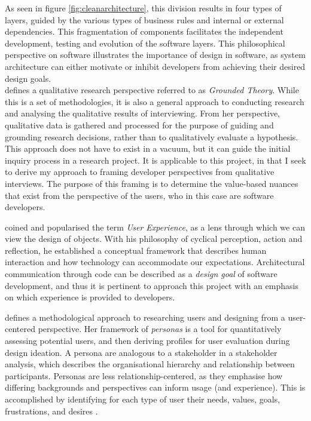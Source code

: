 \documentclass[../report.tex]{subfiles}
\begin{document}
As seen in figure \ref{fig:cleanarchitecture}, this division results in four types of layers, guided by the various types of business rules and internal or external dependencies. This fragmentation of components facilitates the independent development, testing and evolution of the software layers. This philosophical perspective on software illustrates the importance of design in software, as system architecture can either motivate or inhibit developers from achieving their desired design goals. \\


\cite{charmaz2006constructing} defines a qualitative research perspective referred to as \textit{Grounded Theory}. While this is a set of methodologies, it is also a general approach to conducting research and analysing the qualitative results of interviewing. From her perspective, qualitative data is gathered and processed for the purpose of guiding and grounding research decisions, rather than to qualitatively evaluate a hypothesis. This approach does not have to exist in a vacuum, but it can guide the initial inquiry process in a research project. It is applicable to this project, in that I seek to derive my approach to framing developer perspectives from qualitative interviews. The purpose of this framing is to determine the value-based nuances that exist from the perspective of the users, who in this case are software developers.

\cite{norman2013design} coined and popularised the term \textit{User Experience}, as a lens through which we can view the design of objects. With his philosophy of cyclical perception, action and reflection, he established a conceptual framework that describes human interaction and how technology can accommodate our expectations. Architectural communication through code can be described as a \textit{design goal} of software development, and thus it is pertinent to approach this project with an emphasis on which experience is provided to developers.

\cite{buley2013user} defines a methodological approach to researching users and designing from a user-centered perspective. Her framework of \textit{personas} is a tool for quantitatively assessing potential users, and then deriving profiles for user evaluation during design ideation. A persona are analogous to a stakeholder in a stakeholder analysis, which describes the organisational hierarchy and relationship between participants. Personas are less relationship-centered, as they emphasise how differing backgrounds and perspectives can inform usage (and experience). This is accomplished by identifying for each type of user their needs, values, goals, frustrations, and desires \cite[132]{buley2013user}. \\
\end{document}

